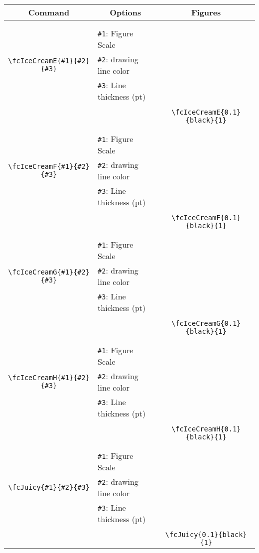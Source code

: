 \documentclass[x11names]{article}
\begin{document}
\begin{table}[H]\centering\begin{tabular}{|c|l|c|}\hline {\bf Command}& \multicolumn{1}{c|}{{\bf Options}} & {\bf Figures}\\  \hline	&&\multirow{5}{*}{\fcIceCreamE{0.1}{black}{1}}\\	&&\\	&\verb|#1|: Figure Scale &\\	\verb|\fcIceCreamE{#1}{#2}{#3}|&	\verb|#2|: drawing line color &\\	&\verb|#3|: Line thickness (pt) &\\ &&\\&&	\verb|\fcIceCreamE{0.1}{black}{1}|\\\hline 	
	&&\multirow{5}{*}{\fcIceCreamF{0.1}{black}{1}}\\	&&\\	&\verb|#1|: Figure Scale &\\	\verb|\fcIceCreamF{#1}{#2}{#3}|&	\verb|#2|: drawing line color &\\	&\verb|#3|: Line thickness (pt) &\\ &&\\&&	\verb|\fcIceCreamF{0.1}{black}{1}|\\\hline 	
	&&\multirow{5}{*}{\fcIceCreamG{0.1}{black}{1}}\\	&&\\	&\verb|#1|: Figure Scale &\\	\verb|\fcIceCreamG{#1}{#2}{#3}|&	\verb|#2|: drawing line color &\\	&\verb|#3|: Line thickness (pt) &\\ &&\\&&	\verb|\fcIceCreamG{0.1}{black}{1}|\\\hline 	
	&&\multirow{5}{*}{\fcIceCreamH{0.1}{black}{1}}\\	&&\\	&\verb|#1|: Figure Scale &\\	\verb|\fcIceCreamH{#1}{#2}{#3}|&	\verb|#2|: drawing line color &\\	&\verb|#3|: Line thickness (pt) &\\ &&\\&&	\verb|\fcIceCreamH{0.1}{black}{1}|\\\hline 	
	&&\multirow{5}{*}{\fcJuicy{0.1}{black}{1}}\\	&&\\	&\verb|#1|: Figure Scale &\\	\verb|\fcJuicy{#1}{#2}{#3}|&	\verb|#2|: drawing line color &\\	&\verb|#3|: Line thickness (pt) &\\ &&\\&&	\verb|\fcJuicy{0.1}{black}{1}|\\\hline 	

\end{tabular}
\end{table}
\end{document}
